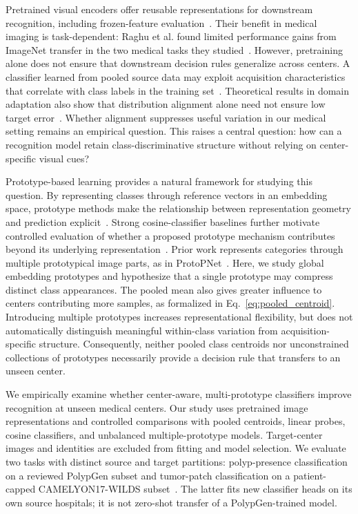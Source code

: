 Pretrained visual encoders offer reusable representations for downstream recognition, including frozen-feature evaluation~\cite{oquab2024dinov2}. Their benefit in medical imaging is task-dependent: Raghu et al. found limited performance gains from ImageNet transfer in the two medical tasks they studied~\cite{raghu2019transfusion}. However, pretraining alone does not ensure that downstream decision rules generalize across centers. A classifier learned from pooled source data may exploit acquisition characteristics that correlate with class labels in the training set~\cite{zech2018generalization}. Theoretical results in domain adaptation also show that distribution alignment alone need not ensure low target error~\cite{zhao2019invariant}. Whether alignment suppresses useful variation in our medical setting remains an empirical question. This raises a central question: how can a recognition model retain class-discriminative structure without relying on center-specific visual cues?

Prototype-based learning provides a natural framework for studying this question. By representing classes through reference vectors in an embedding space, prototype methods make the relationship between representation geometry and prediction explicit~\cite{snell2017prototypical}. Strong cosine-classifier baselines further motivate controlled evaluation of whether a proposed prototype mechanism contributes beyond its underlying representation~\cite{chen2019closer}. Prior work represents categories through multiple prototypical image parts, as in ProtoPNet~\cite{chen2019protopnet}. Here, we study global embedding prototypes and hypothesize that a single prototype may compress distinct class appearances. The pooled mean also gives greater influence to centers contributing more samples, as formalized in Eq.~\ref{eq:pooled_centroid}. Introducing multiple prototypes increases representational flexibility, but does not automatically distinguish meaningful within-class variation from acquisition-specific structure. Consequently, neither pooled class centroids nor unconstrained collections of prototypes necessarily provide a decision rule that transfers to an unseen center.

We empirically examine whether center-aware, multi-prototype classifiers improve recognition at unseen medical centers. Our study uses pretrained image representations and controlled comparisons with pooled centroids, linear probes, cosine classifiers, and unbalanced multiple-prototype models. Target-center images and identities are excluded from fitting and model selection. We evaluate two tasks with distinct source and target partitions: polyp-presence classification on a reviewed PolypGen subset and tumor-patch classification on a patient-capped CAMELYON17-WILDS subset~\cite{bandi2019camelyon,koh2021wilds}. The latter fits new classifier heads on its own source hospitals; it is not zero-shot transfer of a PolypGen-trained model.

